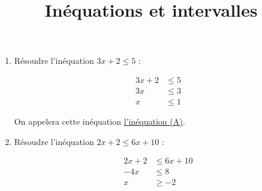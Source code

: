 \documentclass[
	classe=$2^{de}$,
	headerTitle=Chapitre\space 2
]{exercice}
\title{Inéquations et intervalles}
\author{}
\date{}
\begin{document}
\maketitle

\begin{enumerate}
	\item Résoudre l'inéquation $3x + 2 ≤ 5$ :

	      \ifdefined\makeCorrection
		      {\color{red}\begin{align*}
				      3x + 2 & ≤ 5 \\
				      3x     & ≤ 3 \\
				      x      & ≤ 1
			      \end{align*}}
	      \else
		      \vspace{8em}
	      \fi

	      On appelera cette inéquation \uline{l'inéquation (A)}.
	\item Résoudre l'inéquation $2x + 2 ≤ 6x + 10$ :

	      \ifdefined\makeCorrection
		      {\color{red}\begin{align*}
				      2x + 2 & ≤ 6x + 10 \\
				      -4x    & ≤ 8       \\
				      x      & ≥ -2
			      \end{align*}}
	      \else
		      \vspace{8em}
	      \fi


\end{enumerate}
\end{document}
